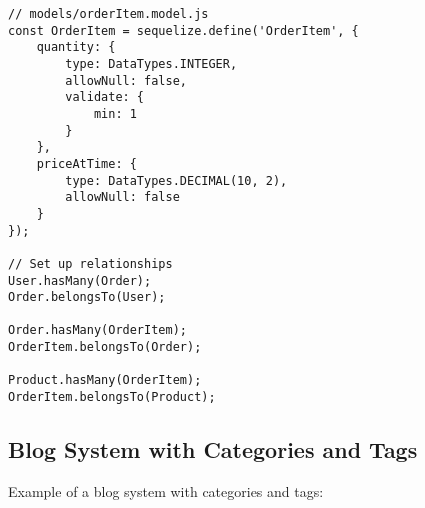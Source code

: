 \documentclass[12pt,a4paper]{book}
\begin{document}
\begin{verbatim}
// models/orderItem.model.js
const OrderItem = sequelize.define('OrderItem', {
	quantity: {
		type: DataTypes.INTEGER,
		allowNull: false,
		validate: {
			min: 1
		}
	},
	priceAtTime: {
		type: DataTypes.DECIMAL(10, 2),
		allowNull: false
	}
});

// Set up relationships
User.hasMany(Order);
Order.belongsTo(User);

Order.hasMany(OrderItem);
OrderItem.belongsTo(Order);

Product.hasMany(OrderItem);
OrderItem.belongsTo(Product);
	\end{verbatim}
	
	\subsection{Blog System with Categories and Tags}
	Example of a blog system with categories and tags:
	
\end{document}
